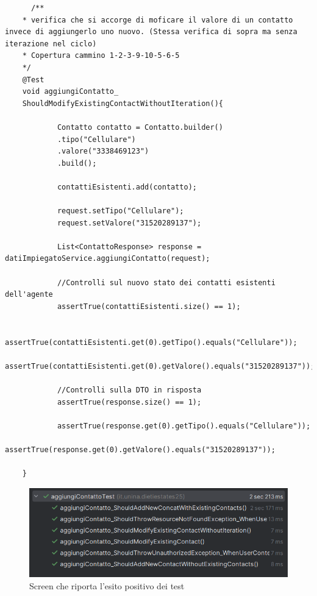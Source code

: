\begin{lstlisting}
	  /**
	* verifica che si accorge di moficare il valore di un contatto invece di aggiungerlo uno nuovo. (Stessa verifica di sopra ma senza iterazione nel ciclo)
	* Copertura cammino 1-2-3-9-10-5-6-5
	*/
	@Test
	void aggiungiContatto_
	ShouldModifyExistingContactWithoutIteration(){
		
			Contatto contatto = Contatto.builder()
			.tipo("Cellulare")
			.valore("3338469123")
			.build();
			
			contattiEsistenti.add(contatto);
			
			request.setTipo("Cellulare");
			request.setValore("31520289137");
			
			List<ContattoResponse> response = datiImpiegatoService.aggiungiContatto(request);
			
			//Controlli sul nuovo stato dei contatti esistenti dell'agente
			assertTrue(contattiEsistenti.size() == 1);
			
			assertTrue(contattiEsistenti.get(0).getTipo().equals("Cellulare"));
			assertTrue(contattiEsistenti.get(0).getValore().equals("31520289137"));
			
			//Controlli sulla DTO in risposta
			assertTrue(response.size() == 1);
			
			assertTrue(response.get(0).getTipo().equals("Cellulare"));
			assertTrue(response.get(0).getValore().equals("31520289137"));
		
	}
\end{lstlisting}

\begin{figure}[H]
	\centering
	\includegraphics[width=0.7\linewidth]{Immagini/unit test/esitiTestaddContatto.png}
	\caption[Esito test 3]{Screen che riporta l'esito positivo dei test}
\end{figure}
